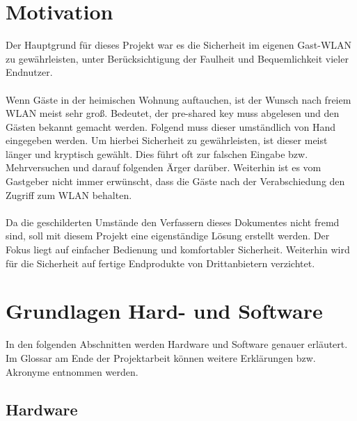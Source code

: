 \documentclass[a4paper,11pt,singlespacing]{article}
\begin{document}
    	\pagestyle{empty}
    	\tableofcontents
    	\cleardoublepage
    	\pagestyle{plain}

    \section{Motivation}
    	Der Hauptgrund für dieses Projekt war es die Sicherheit im eigenen Gast-WLAN zu gewährleisten, unter Berücksichtigung der Faulheit und Bequemlichkeit vieler Endnutzer. \\ \\
    	Wenn Gäste in der heimischen Wohnung auftauchen, ist der Wunsch nach freiem WLAN meist sehr groß. Bedeutet, der pre-shared key muss abgelesen und den Gästen bekannt gemacht werden. Folgend muss dieser umständlich von Hand eingegeben werden. Um hierbei Sicherheit zu gewährleisten, ist dieser meist länger und kryptisch gewählt. Dies führt oft zur falschen Eingabe bzw. Mehrversuchen und darauf folgenden Ärger darüber. Weiterhin ist es vom Gastgeber nicht immer erwünscht, dass die Gäste nach der Verabschiedung den Zugriff zum WLAN behalten. \\ \\
    	Da die geschilderten Umstände den Verfassern dieses Dokumentes nicht fremd sind, soll mit diesem Projekt eine eigenständige Lösung erstellt werden. Der Fokus liegt auf einfacher Bedienung und komfortabler Sicherheit. Weiterhin wird für die Sicherheit auf fertige Endprodukte von Drittanbietern verzichtet. 
    			
    \section{Grundlagen Hard- und Software}
      	In den folgenden Abschnitten werden Hardware und Software genauer erläutert. Im Glossar am Ende der Projektarbeit können weitere Erklärungen bzw. Akronyme entnommen werden.
      	\subsection{Hardware}
\end{document}
